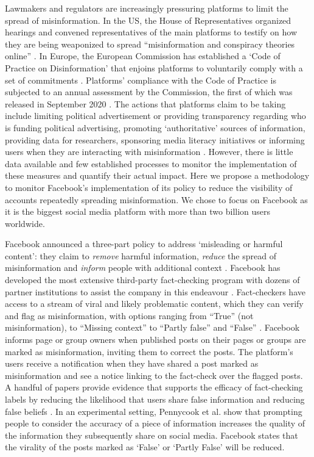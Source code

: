 \documentclass[review]{elsarticle}
\begin{document}
Lawmakers and regulators are increasingly pressuring platforms to limit the spread of misinformation. 
In the US, the House of Representatives organized hearings and convened representatives of the main platforms to testify on how they are being weaponized to spread ``misinformation and conspiracy theories online'' \citep{donovan2020}. 
In Europe, the European Commission has established a `Code of Practice on Disinformation' \citep{codePracticeMisinformation} that enjoins platforms to voluntarily comply with a set of commitments \citep{heldt2019let}.
Platforms' compliance with the Code of Practice is subjected to an annual assessment by the Commission, the first of which was released in September 2020 \citep{firstEUassess}.
The actions that platforms claim to be taking include limiting political advertisement or providing transparency regarding who is funding political advertising, promoting `authoritative' sources of information, providing data for researchers, sponsoring media literacy initiatives or informing users when they are interacting with misinformation \citep{selfassessment}.
However, there is little data available and few established processes to monitor the implementation of these measures and quantify their actual impact. 
Here we propose a methodology to monitor Facebook’s implementation of its policy to reduce the visibility of accounts repeatedly spreading misinformation. 
We chose to focus on Facebook as it is the biggest social media platform with more than two billion users worldwide.

Facebook announced a three-part policy to address ‘misleading or harmful content’: they claim to \textit{remove} harmful information, \textit{reduce} the spread of misinformation and \textit{inform} people with additional context \citep{threePartRecipe}. 
Facebook has developed the most extensive third-party fact-checking program with dozens of partner institutions to assist the company in this endeavour \citep{60factCheckingPartners}.
Fact-checkers have access to a stream of viral and likely problematic content, which they can verify and flag as misinformation, with options ranging from ``True'' (not misinformation), to ``Missing context'' to ``Partly false'' and ``False'' \citep{RatingOptions}.
Facebook informs page or group owners when published posts on their pages or groups are marked as misinformation, inviting them to correct the posts.
The platform's users receive a notification when they have shared a post marked as misinformation and see a notice linking to the fact-check over the flagged posts. 
A handful of papers provide evidence that supports the efficacy of fact-checking labels by reducing the likelihood that users share false information \citep{mena2020cleaning} and reducing false beliefs \citep{porter2021global}. 
In an experimental setting, Pennycook et al. \cite{pennycook2020understanding} show that prompting people to consider the accuracy of a piece of information increases the quality of the information they subsequently share on social media.
Facebook states that the virality of the posts marked as `False' or `Partly False' will be reduced.
\end{document}
